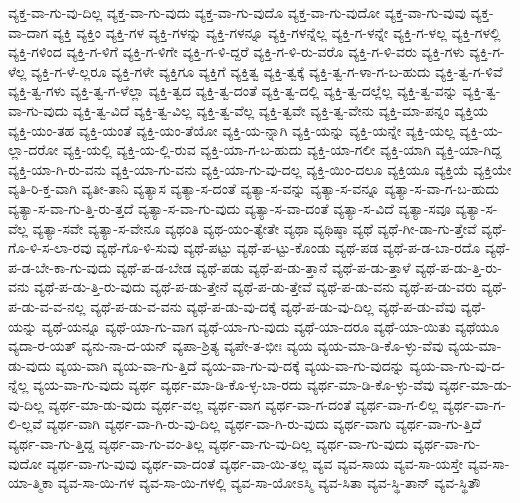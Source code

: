 {ವ್ಯಕ್ತ-ವಾ-ಗು-ವು-ದಿಲ್ಲ
ವ್ಯಕ್ತ-ವಾ-ಗು-ವುದು
ವ್ಯಕ್ತ-ವಾ-ಗು-ವುದೊ
ವ್ಯಕ್ತ-ವಾ-ಗು-ವುದೋ
ವ್ಯಕ್ತ-ವಾ-ಗು-ವುವು
ವ್ಯಕ್ತ-ವಾ-ದಾಗ
ವ್ಯಕ್ತಿ
ವ್ಯಕ್ತಿಂ
ವ್ಯಕ್ತಿ-ಗಳ
ವ್ಯಕ್ತಿ-ಗಳನ್ನು
ವ್ಯಕ್ತಿ-ಗಳನ್ನೂ
ವ್ಯಕ್ತಿ-ಗಳನ್ನೆಲ್ಲ
ವ್ಯಕ್ತಿ-ಗ-ಳನ್ನೇ
ವ್ಯಕ್ತಿ-ಗ-ಳಲ್ಲ
ವ್ಯಕ್ತಿ-ಗಳಲ್ಲಿ
ವ್ಯಕ್ತಿ-ಗಳಿಂದ
ವ್ಯಕ್ತಿ-ಗ-ಳಿಗೆ
ವ್ಯಕ್ತಿ-ಗ-ಳಿಗೇ
ವ್ಯಕ್ತಿ-ಗ-ಳಿ-ದ್ದರೆ
ವ್ಯಕ್ತಿ-ಗ-ಳಿ-ರು-ವರೊ
ವ್ಯಕ್ತಿ-ಗ-ಳಿ-ವರು
ವ್ಯಕ್ತಿ-ಗಳು
ವ್ಯಕ್ತಿ-ಗ-ಳೆಲ್ಲ
ವ್ಯಕ್ತಿ-ಗ-ಳೆ-ಲ್ಲರೂ
ವ್ಯಕ್ತಿ-ಗಳೇ
ವ್ಯಕ್ತಿಗೂ
ವ್ಯಕ್ತಿಗೆ
ವ್ಯಕ್ತಿತ್ವ
ವ್ಯಕ್ತಿ-ತ್ವಕ್ಕೆ
ವ್ಯಕ್ತಿ-ತ್ವ-ಗ-ಳಾ-ಗ-ಬ-ಹುದು
ವ್ಯಕ್ತಿ-ತ್ವ-ಗ-ಳಿವೆ
ವ್ಯಕ್ತಿ-ತ್ವ-ಗಳು
ವ್ಯಕ್ತಿ-ತ್ವ-ಗ-ಳೆಲ್ಲಾ
ವ್ಯಕ್ತಿ-ತ್ವದ
ವ್ಯಕ್ತಿ-ತ್ವ-ದಂತೆ
ವ್ಯಕ್ತಿ-ತ್ವ-ದಲ್ಲಿ
ವ್ಯಕ್ತಿ-ತ್ವ-ದಲ್ಲೆಲ್ಲ
ವ್ಯಕ್ತಿ-ತ್ವ-ವನ್ನು
ವ್ಯಕ್ತಿ-ತ್ವ-ವಾ-ಗು-ವುದು
ವ್ಯಕ್ತಿ-ತ್ವ-ವಿದೆ
ವ್ಯಕ್ತಿ-ತ್ವ-ವಿಲ್ಲ
ವ್ಯಕ್ತಿ-ತ್ವ-ವೆಲ್ಲ
ವ್ಯಕ್ತಿ-ತ್ವವೇ
ವ್ಯಕ್ತಿ-ತ್ವ-ವೇನು
ವ್ಯಕ್ತಿ-ಮಾ-ಪನ್ನಂ
ವ್ಯಕ್ತಿಯ
ವ್ಯಕ್ತಿ-ಯಂ-ತಹ
ವ್ಯಕ್ತಿ-ಯಂತೆ
ವ್ಯಕ್ತಿ-ಯಂ-ತೆಯೋ
ವ್ಯಕ್ತಿ-ಯ-ನ್ನಾಗಿ
ವ್ಯಕ್ತಿ-ಯನ್ನು
ವ್ಯಕ್ತಿ-ಯನ್ನೇ
ವ್ಯಕ್ತಿ-ಯಲ್ಲ
ವ್ಯಕ್ತಿ-ಯ-ಲ್ಲಾ-ದರೋ
ವ್ಯಕ್ತಿ-ಯಲ್ಲಿ
ವ್ಯಕ್ತಿ-ಯ-ಲ್ಲಿ-ರುವ
ವ್ಯಕ್ತಿ-ಯಾ-ಗ-ಬ-ಹುದು
ವ್ಯಕ್ತಿ-ಯಾ-ಗಲೀ
ವ್ಯಕ್ತಿ-ಯಾಗಿ
ವ್ಯಕ್ತಿ-ಯಾ-ಗಿದ್ದ
ವ್ಯಕ್ತಿ-ಯಾ-ಗಿ-ರು-ವನು
ವ್ಯಕ್ತಿ-ಯಾ-ಗು-ವನು
ವ್ಯಕ್ತಿ-ಯಾ-ಗು-ವು-ದಲ್ಲ
ವ್ಯಕ್ತಿ-ಯಿಂ-ದಲೂ
ವ್ಯಕ್ತಿಯೂ
ವ್ಯಕ್ತಿಯೆ
ವ್ಯಕ್ತಿಯೇ
ವ್ಯತಿ-ರಿ-ಕ್ತ-ವಾಗಿ
ವ್ಯತೀ-ತಾನಿ
ವ್ಯತ್ಯಾಸ
ವ್ಯತ್ಯಾ-ಸ-ದಂತೆ
ವ್ಯತ್ಯಾ-ಸ-ವನ್ನು
ವ್ಯತ್ಯಾ-ಸ-ವನ್ನೂ
ವ್ಯತ್ಯಾ-ಸ-ವಾ-ಗ-ಬ-ಹುದು
ವ್ಯತ್ಯಾ-ಸ-ವಾ-ಗು-ತ್ತಿ-ರು-ತ್ತದೆ
ವ್ಯತ್ಯಾ-ಸ-ವಾ-ಗು-ವುದು
ವ್ಯತ್ಯಾ-ಸ-ವಾ-ದಂತೆ
ವ್ಯತ್ಯಾ-ಸ-ವಿದೆ
ವ್ಯತ್ಯಾ-ಸವೂ
ವ್ಯತ್ಯಾ-ಸ-ವೆಲ್ಲ
ವ್ಯತ್ಯಾ-ಸವೇ
ವ್ಯತ್ಯಾ-ಸ-ವೇನೂ
ವ್ಯಥಂತಿ
ವ್ಯಥ-ಯಂ-ತ್ಯೇತೇ
ವ್ಯಥಾ
ವ್ಯಥಿಷ್ಠಾ
ವ್ಯಥೆ
ವ್ಯಥೆ-ಗೀ-ಡಾ-ಗು-ತ್ತೇವೆ
ವ್ಯಥೆ-ಗೊ-ಳಿ-ಸ-ಲಾ-ರವು
ವ್ಯಥೆ-ಗೊ-ಳಿ-ಸುವು
ವ್ಯಥೆ-ಪಟ್ಟು
ವ್ಯಥೆ-ಪ-ಟ್ಟು-ಕೊಂಡು
ವ್ಯಥೆ-ಪಡ
ವ್ಯಥೆ-ಪ-ಡ-ಬಾ-ರದೊ
ವ್ಯಥೆ-ಪ-ಡ-ಬೇ-ಕಾ-ಗು-ವುದು
ವ್ಯಥೆ-ಪ-ಡ-ಬೇಡ
ವ್ಯಥೆ-ಪಡು
ವ್ಯಥೆ-ಪ-ಡು-ತ್ತಾನೆ
ವ್ಯಥೆ-ಪ-ಡು-ತ್ತಾಳೆ
ವ್ಯಥೆ-ಪ-ಡು-ತ್ತಿ-ರು-ವನು
ವ್ಯಥೆ-ಪ-ಡು-ತ್ತಿ-ರು-ವುದು
ವ್ಯಥೆ-ಪ-ಡು-ತ್ತೇನೆ
ವ್ಯಥೆ-ಪ-ಡು-ತ್ತೇವೆ
ವ್ಯಥೆ-ಪ-ಡು-ವನು
ವ್ಯಥೆ-ಪ-ಡು-ವರು
ವ್ಯಥೆ-ಪ-ಡು-ವ-ವ-ನಲ್ಲ
ವ್ಯಥೆ-ಪ-ಡು-ವ-ವನು
ವ್ಯಥೆ-ಪ-ಡು-ವು-ದಕ್ಕೆ
ವ್ಯಥೆ-ಪ-ಡು-ವು-ದಿಲ್ಲ
ವ್ಯಥೆ-ಪ-ಡು-ವೆವು
ವ್ಯಥೆ-ಯನ್ನು
ವ್ಯಥೆ-ಯನ್ನೂ
ವ್ಯಥೆ-ಯಾ-ಗು-ವಾಗ
ವ್ಯಥೆ-ಯಾ-ಗು-ವುದು
ವ್ಯಥೆ-ಯಾ-ದರೂ
ವ್ಯಥೆ-ಯಾ-ಯಿತು
ವ್ಯಥೆಯೂ
ವ್ಯದಾ-ರ-ಯತ್
ವ್ಯನು-ನಾ-ದ-ಯನ್
ವ್ಯಪಾ-ಶ್ರಿತ್ಯ
ವ್ಯಪೇ-ತ-ಭೀಃ
ವ್ಯಯ
ವ್ಯಯ-ಮಾ-ಡಿ-ಕೊ-ಳ್ಳು-ವೆವು
ವ್ಯಯ-ಮಾ-ಡು-ವುದು
ವ್ಯಯ-ವಾಗಿ
ವ್ಯಯ-ವಾ-ಗು-ತ್ತಿದೆ
ವ್ಯಯ-ವಾ-ಗು-ವು-ದಕ್ಕೆ
ವ್ಯಯ-ವಾ-ಗು-ವುದನ್ನು
ವ್ಯಯ-ವಾ-ಗು-ವು-ದ-ನ್ನೆಲ್ಲ
ವ್ಯಯ-ವಾ-ಗು-ವುದು
ವ್ಯರ್ಥ
ವ್ಯರ್ಥ-ಮಾ-ಡಿ-ಕೊ-ಳ್ಳ-ಬಾ-ರದು
ವ್ಯರ್ಥ-ಮಾ-ಡಿ-ಕೊ-ಳ್ಳು-ವೆವು
ವ್ಯರ್ಥ-ಮಾ-ಡು-ವು-ದಿಲ್ಲ
ವ್ಯರ್ಥ-ಮಾ-ಡು-ವುದು
ವ್ಯರ್ಥ-ವಲ್ಲ
ವ್ಯರ್ಥ-ವಾಗ
ವ್ಯರ್ಥ-ವಾ-ಗ-ದಂತೆ
ವ್ಯರ್ಥ-ವಾ-ಗ-ಲಿಲ್ಲ
ವ್ಯರ್ಥ-ವಾ-ಗ-ಲಿ-ಲ್ಲವೆ
ವ್ಯರ್ಥ-ವಾಗಿ
ವ್ಯರ್ಥ-ವಾ-ಗಿ-ರು-ವು-ದಿಲ್ಲ
ವ್ಯರ್ಥ-ವಾ-ಗಿ-ರು-ವುದು
ವ್ಯರ್ಥ-ವಾಗು
ವ್ಯರ್ಥ-ವಾ-ಗು-ತ್ತಿದೆ
ವ್ಯರ್ಥ-ವಾ-ಗು-ತ್ತಿದ್ದ
ವ್ಯರ್ಥ-ವಾ-ಗು-ವಂ-ತಿಲ್ಲ
ವ್ಯರ್ಥ-ವಾ-ಗು-ವು-ದಿಲ್ಲ
ವ್ಯರ್ಥ-ವಾ-ಗು-ವುದು
ವ್ಯರ್ಥ-ವಾ-ಗು-ವುದೋ
ವ್ಯರ್ಥ-ವಾ-ಗು-ವುವು
ವ್ಯರ್ಥ-ವಾ-ದಂತೆ
ವ್ಯರ್ಥ-ವಾ-ಯಿ-ತಲ್ಲ
ವ್ಯವ
ವ್ಯವ-ಸಾಯ
ವ್ಯವ-ಸಾ-ಯಸ್ತೇ
ವ್ಯವ-ಸಾ-ಯಾ-ತ್ಮಿಕಾ
ವ್ಯವ-ಸಾ-ಯಿ-ಗಳ
ವ್ಯವ-ಸಾ-ಯಿ-ಗಳಲ್ಲಿ
ವ್ಯವ-ಸಾ-ಯೋಽಸ್ಮಿ
ವ್ಯವ-ಸಿತಾ
ವ್ಯವ-ಸ್ಥಿ-ತಾನ್
ವ್ಯವ-ಸ್ಥಿತೌ
}
